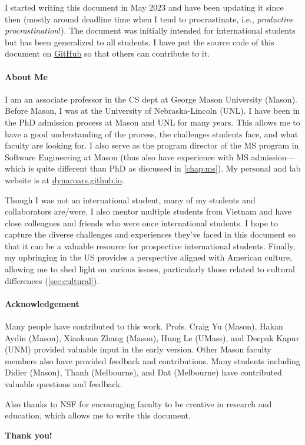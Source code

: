 \documentclass[oneside,11pt,dvipsnames]{book}
\begin{document}
I started writing this document in May 2023 and have been updating it since then (mostly around deadline time when I tend to procrastinate, i.e., \emph{productive procrastination}!). The document was initially intended for international students but has been generalized to all students.
I have put the source code of this document on \href{https://github.com/nguyenthanhvuh/phd-cs-us}{GitHub} so that others can contribute to it.

\paragraph{About Me} I am an associate professor in the CS dept at George Mason University (Mason). Before Mason, I was at the University of Nebraska-Lincoln (UNL). I have been in the PhD admission process at Mason and UNL for many years. This allows me to have a good understanding of the process, the challenges students face, and what faculty are looking for. I also serve as the program director of the MS program in Software Engineering at Mason (thus also have experience with MS admission---which is quite different than PhD as discussed in \autoref{chap:ms}). My personal and lab website is at \href{https://dynaroars.github.io}{dynaroars.github.io}.

Though I was not an international student, many of my students and collaborators are/were. I also mentor multiple students from Vietnam and have close colleagues and friends who were once international students. I hope to capture the diverse challenges and experiences they've faced in this document so that it can be a valuable resource for prospective international students.
Finally, my upbringing in the US provides a perspective aligned with American culture, allowing me to shed light on various issues, particularly those related to cultural differences (\autoref{sec:cultural}).




\paragraph{Acknowledgement} Many people have contributed to this work.
Profs. Craig Yu (Mason), Hakan Aydin (Mason), 
Xiaokuan Zhang (Mason), Hung Le (UMass), and Deepak Kapur (UNM) provided valuable input in the early version. Other Mason faculty members also have provided feedback and contributions.  Many students including Didier (Mason), Thanh (Melbourne), and Dat (Melbourne) have contributed valuable questions and feedback. 

Also thanks to NSF for encouraging faculty to be creative in research and education, which allows me to write this document. 

\textbf{Thank you!}

%
%
\end{document}
